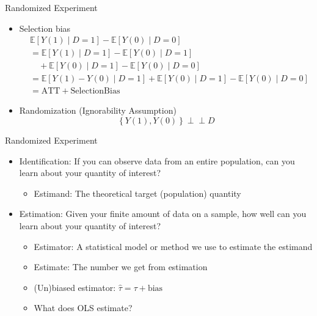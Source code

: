 \documentclass[handout]{beamer}
\begin{document}
\begin{frame}{Randomized Experiment}
    \begin{itemize}
        \item Selection bias
            $$
            \begin{aligned}
                &\mathbb{E}\left[ Y(1) \mid D = 1 \right] - \mathbb{E}\left[ Y(0) \mid D = 0 \right] \\
                &= \mathbb{E}\left[ Y(1) \mid D = 1 \right] - \mathbb{E}\left[ Y(0) \mid D = 1 \right] \\ 
                &\quad + \mathbb{E}\left[ Y(0) \mid D = 1 \right] - \mathbb{E}\left[ Y(0) \mid D = 0 \right] \\
                &= \mathbb{E}\left[ Y(1) - Y(0) \mid D = 1 \right] + \mathbb{E}\left[ Y(0) \mid D = 1 \right] - \mathbb{E}\left[ Y(0) \mid D = 0 \right] \\
                &= \mathrm{ATT} + \mathrm{Selection Bias}
            \end{aligned}
            $$
        \item Randomization (Ignorability Assumption)
            $$
            \left\{ Y(1), Y(0) \right\} \perp\!\!\!\perp D
            $$ 
    \end{itemize}
\end{frame}

\begin{frame}{Randomized Experiment}
    \begin{itemize}
        \item Identification: If you can observe data from an entire population, can you learn about your quantity of interest?
            \begin{itemize}
                \item Estimand: The theoretical target (population) quantity
            \end{itemize}
        \item Estimation: Given your finite amount of data on a sample, how well can you learn about your quantity of interest?
            \begin{itemize}
                \item Estimator: A statistical model or method we use to estimate the estimand
                \item Estimate: The number we get from estimation
                \item (Un)biased estimator: $\hat{\tau} = \tau + \text{bias}$
                \item What does OLS estimate?
            \end{itemize}
    \end{itemize}
\end{frame}
\end{document}

